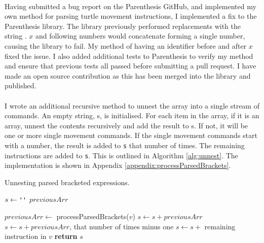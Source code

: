 \paragraph{} Having submitted a bug report on the Parenthesis GitHub, and implemented my own method for parsing turtle movement instructions, I implemented a fix to the Parenthesis library. The library previously performed replacements with the string . $x$ and following numbers would concatenate forming a single number, causing the library to fail. My method of having an identifier before and after $x$ fixed the issue. I also added additional tests to Parenthesis to verify my method and ensure that previous tests all passed before submitting a pull request. I have made an open source contribution as this has been merged into the library and published.

\paragraph{} I wrote an additional recursive method to unnest the array into a single stream of commands. An empty string, s, is initialised. For each item in the array, if it is an array, unnest the contents recursively and add the result to s. If not, it will be one or more single movement commands. If the single movement commands start with a number, the result is added to \texttt{s} that number of times. The remaining instructions are added to \texttt{s}. This is outlined in Algorithm \ref{alg:unnest}. The implementation is shown in Appendix \ref{appendix:processParsedBrackets}.

\begin{algorithm}[!htbp]
\caption{Unnesting parsed bracketed expressions.}
\label{alg:unnest}
\begin{algorithmic}[1]

   \State $s\gets \texttt{\upquote{}}$
   \State $previousArr$

     \State $previousArr \gets$ processParsedBrackets($v$)
    \Else
        \State $s \gets s + previousArr$
          \State $s \gets s + previousArr$, that number of times minus one
        \EndIf
       \EndIf
       \State $s \gets s + $ remaining instruction in $v$
    \EndIf
   \EndFor
   \State \textbf{return} $s$

\EndProcedure
\end{algorithmic}
\end{algorithm}

